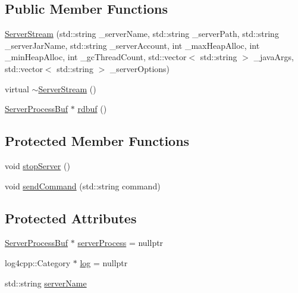 \subsection*{Public Member Functions}
\begin{DoxyCompactItemize}
\item 
\hyperlink{class_minecraft_server_service_1_1_server_stream_a18567f4d5f6752325172e3fb5efb0f6c}{Server\+Stream} (std\+::string \+\_\+server\+Name, std\+::string \+\_\+server\+Path, std\+::string \+\_\+server\+Jar\+Name, std\+::string \+\_\+server\+Account, int \+\_\+max\+Heap\+Alloc, int \+\_\+min\+Heap\+Alloc, int \+\_\+gc\+Thread\+Count, std\+::vector$<$ std\+::string $>$ \+\_\+java\+Args, std\+::vector$<$ std\+::string $>$ \+\_\+server\+Options)
\item 
virtual \hyperlink{class_minecraft_server_service_1_1_server_stream_a8cb55e6e481c6d4338d446a7b92df3d3}{$\sim$\+Server\+Stream} ()
\item 
\hyperlink{class_minecraft_server_service_1_1_server_process_buf}{Server\+Process\+Buf} $\ast$ \hyperlink{class_minecraft_server_service_1_1_server_stream_acfaf50ff9b711062de3bb8a650ba11dd}{rdbuf} ()
\end{DoxyCompactItemize}
\subsection*{Protected Member Functions}
\begin{DoxyCompactItemize}
\item 
void \hyperlink{class_minecraft_server_service_1_1_server_stream_af8529e03480497e12e171cf93709e757}{stop\+Server} ()
\item 
void \hyperlink{class_minecraft_server_service_1_1_server_stream_a194212956c6eb928a2db1b25e70dc565}{send\+Command} (std\+::string command)
\end{DoxyCompactItemize}
\subsection*{Protected Attributes}
\begin{DoxyCompactItemize}
\item 
\hyperlink{class_minecraft_server_service_1_1_server_process_buf}{Server\+Process\+Buf} $\ast$ \hyperlink{class_minecraft_server_service_1_1_server_stream_a974b8007a5c437d221f482543044acb4}{server\+Process} = nullptr
\item 
log4cpp\+::\+Category $\ast$ \hyperlink{class_minecraft_server_service_1_1_server_stream_a698b7dfef7f76adc005d81eb6a11dd28}{log} = nullptr
\item 
std\+::string \hyperlink{class_minecraft_server_service_1_1_server_stream_aa6aeeef202bcbaf6b6668a03f7682efb}{server\+Name}
\end{DoxyCompactItemize}


